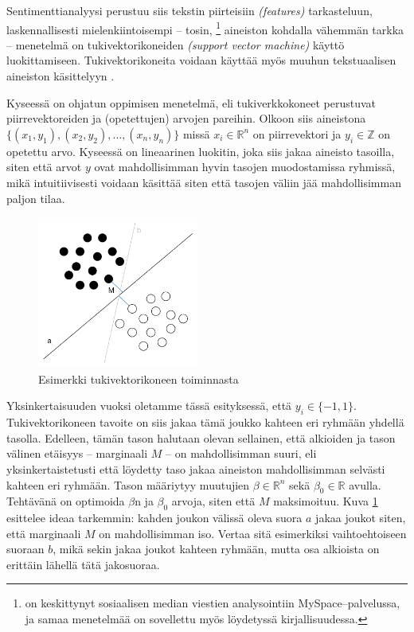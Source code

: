 \documentclass[finnish,gradu,twoside,12pt]{tktltiki}
\begin{document}
{Sentimenttianalyysi perustuu siis tekstin piirteisiin \textit{(features)} tarkasteluun, laskennallisesti mielenkiintoisempi -- tosin, \citet{Thelwall2010}\footnote{\citet{Thelwall2010} on keskittynyt sosiaalisen median viestien analysointiin MySpace--palvelussa, ja samaa menetelmää on sovellettu myös löydetyssä kirjallisuudessa.} aineiston kohdalla vähemmän tarkka -- menetelmä on tukivektorikoneiden \textit{(support vector machine)} käyttö luokittamiseen. Tukivektorikoneita voidaan käyttää myös muuhun tekstuaalisen aineiston käsittelyyn \citep[esimerkiksi][]{Weber2012}.

Kyseessä on ohjatun oppimisen menetelmä, eli tukiverkkokoneet perustuvat piirrevektoreiden ja (opetettujen) arvojen pareihin. Olkoon siis aineistona \newline $\{ (x_1, y_1), (x_2, y_2), \ldots , (x_n, y_n) \}$ missä $x_i \in \mathbb{R}^n$ on piirrevektori ja $y_i \in \mathbb{Z}$ on opetettu arvo. Kyseessä on lineaarinen luokitin, joka siis jakaa aineisto tasoilla, siten että arvot $y$ ovat mahdollisimman hyvin tasojen muodostamissa ryhmissä, mikä intuitiivisesti voidaan käsittää siten että tasojen väliin jää mahdollisimman paljon tilaa.

\begin{figure}
\includegraphics[height=5cm]{images/svm.png} 
\caption{Esimerkki tukivektorikoneen toiminnasta}
\label{fig:svm}
\end{figure}

Yksinkertaisuuden vuoksi oletamme tässä esityksessä, että $y_i \in \{ -1, 1 \}$. Tukivektorikoneen tavoite on siis jakaa tämä joukko kahteen eri ryhmään yhdellä tasolla. Edelleen, tämän tason halutaan olevan sellainen, että alkioiden ja tason välinen etäisyys -- marginaali $M$ -- on mahdollisimman suuri, eli yksinkertaistetusti että löydetty taso jakaa aineiston mahdollisimman selvästi kahteen eri ryhmään. Tason määriytyy muutujien $\beta \in \mathbb{R}^n$ sekä $\beta_0 \in \mathbb{R}$ avulla. Tehtävänä on optimoida $\beta$n ja $\beta_0$ arvoja, siten että $M$ maksimoituu. Kuva \ref{fig:svm} esittelee ideaa tarkemmin: kahden joukon välissä oleva suora $a$ jakaa joukot siten, että marginaali $M$ on mahdollisimman iso. Vertaa sitä esimerkiksi vaihtoehtoiseen suoraan $b$, mikä sekin jakaa joukot kahteen ryhmään, mutta osa alkioista on erittäin lähellä tätä jakosuoraa.

}
\end{document}

